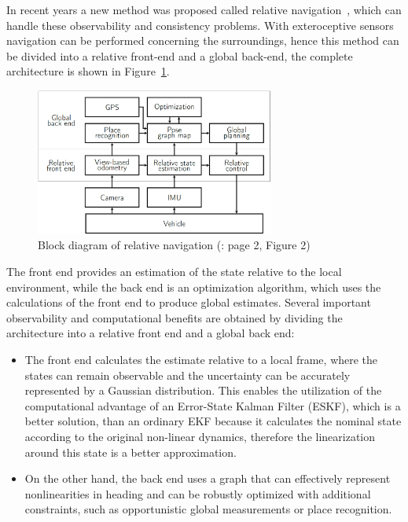 In recent years a new method was proposed called relative navigation~\cite{rel-nav-1, rel-nav-2}, which can handle these observability and consistency problems. With exteroceptive sensors navigation can be performed concerning the surroundings, hence this method can be divided into a relative front-end and a global back-end, the complete architecture is shown in Figure~\ref{fig:real-nav}. 
\begin{figure}[!ht]
    \centering
    \includegraphics[width=0.7\textwidth]{figures/rel-nav}
    \caption{Block diagram of relative navigation (\cite{rel-nav}: page 2, Figure 2)}\label{fig:real-nav}
\end{figure}
The front end provides an estimation of the state relative to the local environment, while the back end is an optimization algorithm, which uses the calculations of the front end to produce global estimates. Several important observability and computational benefits are obtained by dividing the architecture into a relative front end and a global back end:
\begin{itemize}
    \item 
    The front end calculates the estimate relative to a local frame, where the states can remain observable and the uncertainty can be accurately represented by a Gaussian distribution. This enables the utilization of the computational advantage of an Error-State Kalman Filter (ESKF), which is a better solution, than an ordinary EKF because it calculates the nominal state according to the original non-linear dynamics, therefore the linearization around this state is a better approximation.
    
    \item 
     On the other hand, the back end uses a graph that can effectively represent nonlinearities in heading and can be robustly optimized with additional constraints, such as opportunistic global measurements or place recognition.
\end{itemize}

